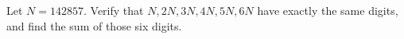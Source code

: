 Let $N=142857$. Verify that $N,2N,3N,4N,5N,6N$ have exactly the same digits, and find the sum of those six digits.
